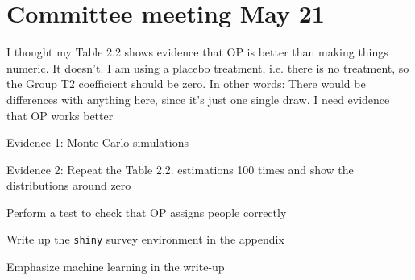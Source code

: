 


\section*{Committee meeting May 21}
	\begin{coi}
		\item I thought my Table 2.2 shows evidence that OP is better than making things numeric. It doesn't. I am using a placebo treatment, i.e. there is no treatment, so the Group T2 coefficient should be zero. In other words: There would be differences with anything here, since it's just one single draw. I need evidence that OP works better
			\begin{coi}
				\item Evidence 1: Monte Carlo simulations
				\item Evidence 2: Repeat the Table 2.2. estimations 100 times and show the distributions around zero
			\end{coi}
		\item Perform a test to check that OP assigns people correctly
		\item Write up the \texttt{shiny} survey environment in the appendix
		\item Emphasize machine learning in the write-up
	\end{coi}
	



